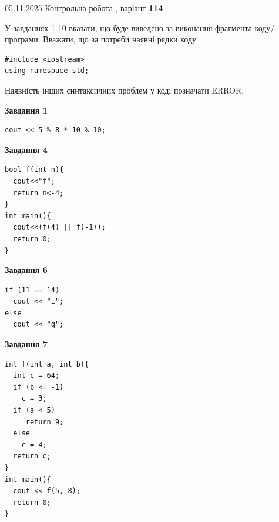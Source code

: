 \documentclass[12pt, ukrainian]{article}
\begin{document}
{\Large{05.11.2025 Контрольна робота , варіант  \No \textbf { 114 }\par}}
{
\begin {large}
У завданнях 1-10 вказати, що буде виведено за виконання фрагмента коду/про\-гра\-ми.
Вважати, що за потреби наявні рядки коду
\begin{verbatim}
#include <iostream>
using namespace std;
\end{verbatim}
Наявність інших синтаксичних проблем у коді позначати ERROR.

\begin{minipage}[t]{7.0cm}

\begin{center}
\textbf{Завдання 1}
\end{center}
\vspace{-8mm}

\begin{verbatim}
cout << 5 % 8 * 10 % 10;
\end{verbatim}



\begin{center}
\textbf{Завдання 4}
\end{center}
\vspace{-8mm}

\begin{verbatim}
bool f(int n){
  cout<<"f";
  return n<-4;
}
int main(){
  cout<<(f(4) || f(-1));
  return 0;
}
\end{verbatim}



\begin{center}
\textbf{Завдання 6}
\end{center}
\vspace{-8mm}

\begin{verbatim}
if (11 == 14)
  cout << "i";
else
  cout << "q";
\end{verbatim}



\begin{center}
\textbf{Завдання 7}
\end{center}
\vspace{-8mm}

\begin{verbatim}
int f(int a, int b){
  int c = 64;
  if (b <= -1)
    c = 3;
  if (a < 5)
     return 9;
  else
    c = 4;
  return c;
}
int main(){
  cout << f(5, 8);
  return 0;
}
\end{verbatim}


\end{minipage}
\end{large}}
\end{document}
